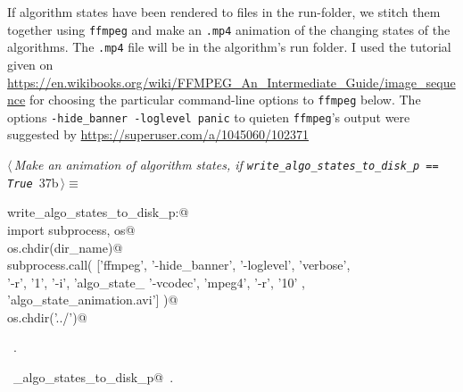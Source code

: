 \documentclass[11.5pt]{report}
\begin{document}
\vspace{-0.8cm}\newchunk If algorithm states have been rendered to files in the run-folder, we stitch them together using \verb|ffmpeg|
and make an \verb|.mp4| animation of the changing states of the algorithms. The \verb|.mp4| file will be in the algorithm's
run folder. I used the  tutorial given on \url{https://en.wikibooks.org/wiki/FFMPEG_An_Intermediate_Guide/image_sequence}
for choosing the particular command-line options to \verb|ffmpeg| below. The options \texttt{-hide\_banner -loglevel panic} 
to quieten \verb|ffmpeg|'s output were suggested by  \url{https://superuser.com/a/1045060/102371} 


\begin{flushleft} \small\label{scrap48}\raggedright\small
{} $\langle\,${\itshape Make an animation of algorithm states, if \verb|write_algo_states_to_disk_p == True|}\nobreak\ {\footnotesize {37b}}$\,\rangle\equiv$
\vspace{-1ex}
\begin{list}{}{} \item
\mbox{}\verb@if write_algo_states_to_disk_p:@\\
\mbox{}\verb@     import subprocess, os@\\
\mbox{}\verb@     os.chdir(dir_name)@\\
\mbox{}\verb@     subprocess.call( ['ffmpeg',  '-hide_banner', '-loglevel', 'verbose', \@\\
\mbox{}\verb@                       '-r', '1',  '-i', 'algo_state_%05d.png', \@\\
\mbox{}\verb@                       '-vcodec', 'mpeg4', '-r', '10' , \@\\
\mbox{}\verb@                       'algo_state_animation.avi']  )@\\
\mbox{}\verb@     os.chdir('../')@\\
\mbox{}\verb@@{\NWsep}
\end{list}
\vspace{-1.5ex}
\footnotesize
\begin{list}{}{\setlength{\itemsep}{-\parsep}\setlength{\itemindent}{-\leftmargin}}
\item \NWtxtMacroRefIn\ .
\item \NWtxtIdentsUsed\nobreak\  \verb@write_algo_states_to_disk_p@\nobreak\ .
\item{}
\end{list}
\vspace{4ex}
\end{flushleft}
\end{document}
